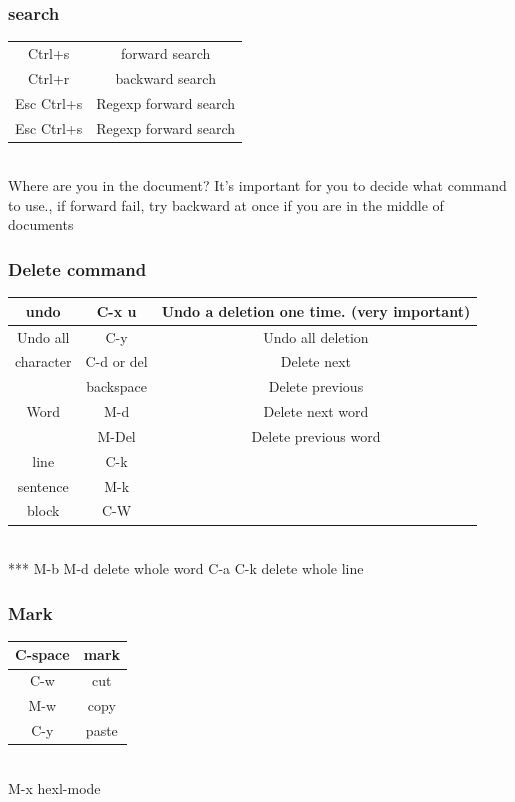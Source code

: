 \documentclass[a4paper,12pt,twoside]{book}
\begin{document}
\begin{CJK*}{UTF8}{song}
\subsubsection{search}
\begin{tabular}{|c|c|}
\hline	Ctrl+s & forward search \\
	Ctrl+r & backward search \\

\hline	Esc Ctrl+s & Regexp forward search \\
	Esc Ctrl+s & Regexp forward search \\
\hline
\end{tabular}\\
Where are you in the document? It's important for you to decide what command to use., if forward fail, try backward at once if you are in the middle of documents

\subsubsection{Delete command}
\begin{tabular}{|c|c|c|}
\hline	undo & C-x u & Undo a deletion one time. (very important) \\
\hline	Undo all & C-y	& Undo all deletion \\
\hline	character	& C-d or del	& Delete next \\ \cline{2-3}
	& backspace & Delete previous \\
\hline	Word & M-d & Delete next word \\ \cline{2-3}
	& M-Del & Delete previous word \\
\hline	line	& C-k & \\
\hline	sentence & M-k &	\\
\hline	block	& C-W &	\\
\hline
\end{tabular} \\
*** M-b M-d delete whole word C-a C-k delete whole line

\subsubsection{Mark}
\begin{tabular}{|c|c|}
\hline C-space	& mark\\
\hline C-w & cut\\
\hline M-w & copy\\
\hline C-y & paste\\
\hline
\end{tabular} \\
M-x hexl-mode


\end{CJK*}
\end{document}
